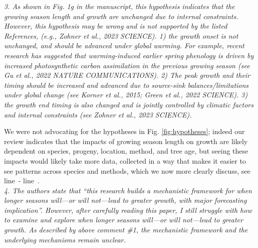 \documentclass[11pt]{article}
\newcommand{\lr}[1]{line~\lineref{#1}}
\begin{document}

\emph{3. As shown in Fig. 1g in the manuscript, this hypothesis indicates that the growing season length and growth are unchanged due to internal constraints. However, this hypothesis may be wrong and is not supported by the listed References, (e.g., Zohner et al., 2023 SCIENCE). 1) the growth onset is not unchanged, and should be advanced under global warming. For example, recent research has suggested that warming-induced earlier spring phenology is driven by increased photosynthetic carbon assimilation in the previous growing season (see Gu et al., 2022 NATURE COMMUNICATIONS). 2) The peak growth and their timing should be increased and advanced due to source-sink balances/limitations under global change (see Korner et al., 2015; Green et al., 2022 SCIENCE). 3) the growth end timing is also changed and is jointly controlled by climatic factors and internal constraints (see Zohner et al., 2023 SCIENCE).}

We were not advocating for the hypotheses in Fig. \ref{fig:hypotheses}; indeed our review indicates that the impacts of growing season length on growth are likely dependent on species, progeny, location, method, and tree age, but seeing these impacts would likely take more data, collected in a way that makes it easier to see patterns across species and methods, which we now more clearly discuss, see  \lr{R2complaint3S}- \lr{R2complaint3E}.\\ %

\emph{4. The authors state that ``this research builds a mechanistic framework for when longer seasons will---or will not---lead to greater growth, with major forecasting implication''. However, after carefully reading this paper, I still struggle with how to examine and explore when longer seasons will---or will not---lead to greater growth. As described by above comment \#1, the mechanistic framework and the underlying mechanisms remain unclear.}
\end{document}
